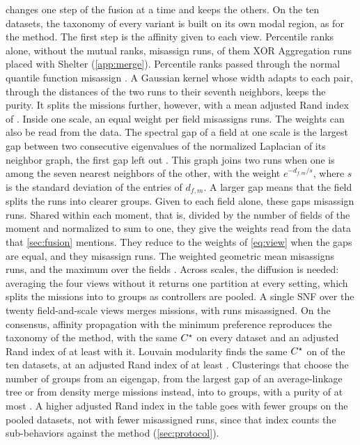  changes one step of the fusion at a time and keeps the others. On the ten
datasets, the taxonomy of every variant is built on its own modal region, as for the method. The first step is the affinity
given to each view. Percentile ranks alone, without the mutual ranks, misassign
 runs,  of them XOR Aggregation runs placed with
Shelter (\cref{app:merge}). Percentile ranks passed through the normal quantile function misassign
. A Gaussian kernel whose width adapts to each pair, through the distances of the two runs to their seventh neighbors, keeps the purity. It splits the missions
further, however, with a mean adjusted Rand index of . Inside one scale, an equal weight per field misassigns
 runs. The weights can also be read from the data. The spectral gap of a
field at one scale is the largest gap between two consecutive eigenvalues of the normalized Laplacian of its
neighbor graph, the first gap left out \citep{von2007tutorial}. This graph joins two runs when one is among the
seven nearest neighbors of the other, with the weight $e^{-d_{f,m}/s}$, where $s$ is the standard deviation of
the entries of $d_{f,m}$. A larger gap means that the field splits the runs into clearer groups. Given to each
field alone, these gaps misassign  runs. Shared within each moment, that is,
divided by the number of fields of the moment and normalized to sum to one, they give the weights read from the
data that \cref{sec:fusion} mentions. They reduce to the weights of \eqref{eq:view} when the gaps are equal, and they misassign
 runs. The
weighted geometric mean misassigns  runs, and the maximum over the fields
. Across scales, the diffusion is needed: averaging the four views without it returns one partition at every setting, which splits the
missions into  to  groups as controllers are pooled. A single SNF over
the twenty field-and-scale views merges missions, with  runs misassigned. On
the consensus, affinity propagation with the minimum preference reproduces the taxonomy of the method, with the
same $C^{\star}$ on every dataset and an adjusted Rand index of at least  with it. Louvain
modularity finds the same $C^{\star}$ on  of the ten datasets, at an adjusted Rand index of at least
. Clusterings that choose the number of groups from an
eigengap, from the largest gap of an average-linkage tree or from density merge missions instead,
into  to  groups, with a purity of at most
. A higher adjusted Rand
index in the table goes with fewer groups on the pooled datasets, not with fewer misassigned runs,
since that index counts the sub-behaviors against the method (\cref{sec:protocol}).


